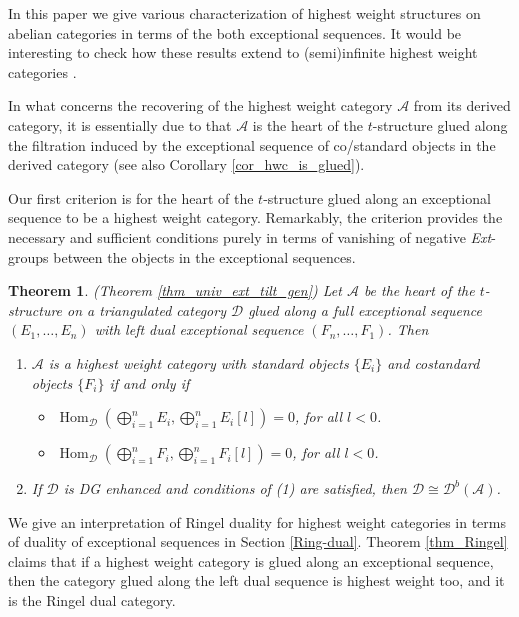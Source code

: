 \documentclass[12pt,a4paper]{amsart}
\newcommand{\aA}{{\mathcal{A}}}
\newcommand{\dD}{{\mathcal{D}}}
\newcommand{\tr}{{\mbox{$t$-struc}\-tu\-r}}
\newcommand{\Hom}{\mathop{\textrm{Hom}}\nolimits}
\newtheorem{THM}[LEM]{Theorem}
\theoremstyle{definition}
\begin{document}
	In this paper we give various characterization of highest weight structures on abelian categories in terms of the both exceptional sequences. It would be interesting to check how these results extend to (semi)infinite highest weight categories \cite{BrSt24}.
	
	In what concerns the recovering of the highest weight category $\aA$ from its derived category, it is essentially due to \cite{CPS} that $\aA$ is the heart of the \tr e glued along the filtration  induced by the exceptional sequence of co/standard objects in the derived category (see also Corollary \ref{cor_hwc_is_glued}).
	
	Our first criterion is for the heart of the \tr e glued along an exceptional sequence to be a highest weight category. Remarkably, the criterion provides the necessary and sufficient conditions purely in terms of vanishing of negative {\it Ext}-groups between the objects in the exceptional sequences. 

\begin{THM}(Theorem \ref{thm_univ_ext_tilt_gen})
	Let $\aA$ be the heart of the \tr e on a triangulated category $\dD$ glued along a full exceptional sequence $(E_1,\ldots,E_n)$  with left dual exceptional sequence $(F_n,\ldots, F_1)$. Then 
	\begin{enumerate}
		\item$\aA$ is a highest weight category with standard objects $\{E_i\}$ and costandard objects $\{F_i\}$ if and only if
		\begin{itemize}
		\item
		$\Hom_{\dD}(\bigoplus_{i=1}^n E_i, \bigoplus_{i=1}^n E_i[l])=0$, for all $l<0$.
		\item
		$\Hom_{\dD}(\bigoplus_{i=1}^n F_i, \bigoplus_{i=1}^n F_i[l])=0$, for all $l<0$. 
		\end{itemize}
		\item If $\dD$ is DG enhanced \cite{BK} and conditions of (1) are satisfied, then $\dD\cong \dD^b(\aA)$.
	\end{enumerate}
\end{THM}
	
	We give an interpretation of Ringel duality for highest weight categories in terms of duality of exceptional sequences in Section \ref{Ring-dual}. Theorem \ref{thm_Ringel} claims that if a highest weight category is glued along an exceptional  sequence, then the category glued along the left dual sequence is highest weight too, and it is the Ringel dual category.
	
\end{document}
